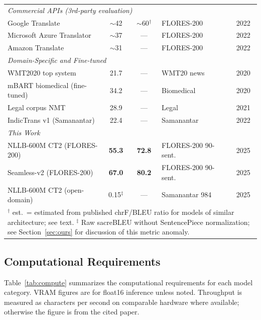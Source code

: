\documentclass[conference]{IEEEtran}
\begin{document}
\begin{table}[t]
\begin{tabular}{p{3.4cm} c c p{1.7cm} c}
    \midrule
    \multicolumn{5}{l}{\textit{Commercial APIs (3rd-party evaluation)}} \\
    Google Translate~\cite{nllb2022}             & $\sim$42 & $\sim$60$^\dagger$ & FLORES-200  & 2022 \\
    Microsoft Azure Translator~\cite{nllb2022}   & $\sim$37 & ---                & FLORES-200  & 2022 \\
    Amazon Translate~\cite{nllb2022}             & $\sim$31 & ---                & FLORES-200  & 2022 \\
    \midrule
    \multicolumn{5}{l}{\textit{Domain-Specific and Fine-tuned}} \\
    WMT2020 top system~\cite{barrault2020wmt}    & 21.7  & ---  & WMT20 news  & 2020 \\
    mBART biomedical (fine-tuned)~\cite{hasan2020low} & 34.2 & --- & Biomedical & 2020 \\
    Legal corpus NMT~\cite{alam2021bengali}      & 28.9  & ---  & Legal       & 2021 \\
    IndicTrans v1 (Samanantar)~\cite{ramesh2022samanantar} & 22.4 & --- & Samanantar & 2022 \\
    \midrule
    \multicolumn{5}{l}{\textit{This Work}} \\
    NLLB-600M CT2 (FLORES-200)~\cite{biswas2025bnentr}  & \textbf{55.3} & \textbf{72.8} & FLORES-200 90-sent. & 2025 \\
    Seamless-v2 (FLORES-200)~\cite{biswas2025bnentr}    & \textbf{67.0} & \textbf{80.2} & FLORES-200 90-sent. & 2025 \\
    NLLB-600M CT2 (open-domain)~\cite{biswas2025bnentr} & 0.15$^\ddagger$ & --- & Samanantar 984 & 2025 \\
    \bottomrule
    \multicolumn{5}{p{13cm}}{\scriptsize
      $^\dagger$ est.\ = estimated from published chrF/BLEU ratio for models of
      similar architecture; see text.
      $^\ddagger$ Raw sacreBLEU without SentencePiece normalization; see
      Section~\ref{sec:ours} for discussion of this metric anomaly.}
  \end{tabular}
\end{table}

\subsection{Computational Requirements}

Table~\ref{tab:compute} summarizes the computational requirements for
each model category.
VRAM figures are for float16 inference unless noted.
Throughput is measured as characters per second on comparable hardware
where available; otherwise the figure is from the cited paper.
\end{document}

